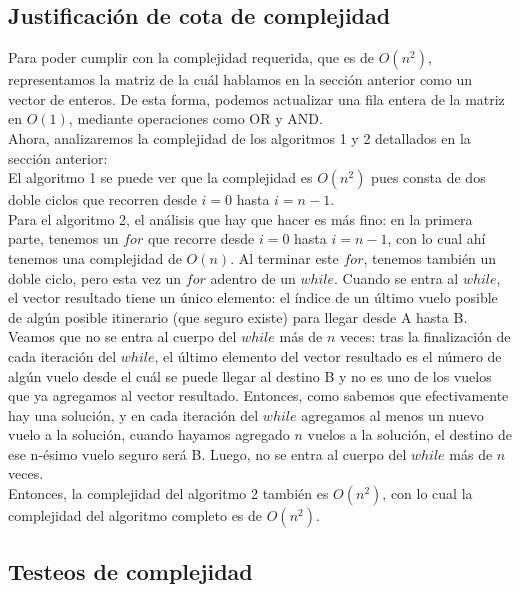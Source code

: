 \documentclass[11pt, a4paper, twoside]{article}
\begin{document}
\subsection{Justificación de cota de complejidad}
Para poder cumplir con la complejidad requerida, que es de $O(n^2)$, representamos
la matriz de la cuál hablamos en la sección anterior como un vector de enteros.
De esta forma, podemos actualizar una fila entera de la matriz en $O(1)$, mediante 
operaciones como OR y AND. \\
Ahora, analizaremos la complejidad de los algoritmos 1 y 2 detallados en la sección anterior: \\
El algoritmo 1 se puede ver que la complejidad es $O(n^2)$ pues consta de dos doble ciclos que
recorren desde $i = 0$ hasta $i = n-1$. \\
Para el algoritmo 2, el análisis que hay que hacer es más fino: en la primera parte, tenemos un
$for$ que recorre desde $i = 0$ hasta $i = n-1$, con lo cual ahí tenemos una complejidad de $O(n)$.
Al terminar este $for$, tenemos también un doble ciclo, pero esta vez un $for$ adentro de un $while$.
Cuando se entra al $while$, el vector resultado tiene un único elemento: el índice de un último 
vuelo posible de algún posible itinerario (que seguro existe) para llegar desde A hasta B.
Veamos que no se entra al cuerpo del $while$ más de $n$ veces: tras la finalización de cada
iteración del $while$, el último elemento del vector resultado es el número de algún vuelo desde el 
cuál se puede llegar al destino B y no es uno de los vuelos que ya agregamos al vector resultado.
Entonces, como sabemos que efectivamente hay una solución, y en cada iteración del $while$ agregamos 
al menos un nuevo vuelo a la solución, cuando hayamos agregado $n$ vuelos a la solución, el destino
de ese n-ésimo vuelo seguro será B. Luego, no se entra al cuerpo del $while$ más de $n$ veces. \\
Entonces, la complejidad del algoritmo 2 también es $O(n^2)$, con lo cual la complejidad del 
algoritmo completo es de $O(n^2)$. \\

\subsection{Testeos de complejidad}



\end{document}
